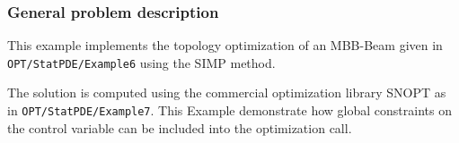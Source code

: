 \subsubsection{General problem description}
This example implements the topology optimization of an MBB-Beam given in \\
{\tt OPT/StatPDE/Example6} using the SIMP method.

The solution is computed using the commercial optimization library SNOPT as in 
{\tt OPT/StatPDE/Example7}. This Example demonstrate how global constraints on
the control variable can be included into the optimization call.